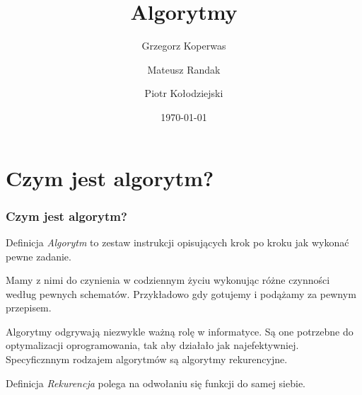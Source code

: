\documentclass{beamer}
\title{Algorytmy}
\author{Grzegorz Koperwas \and Mateusz Randak \and Piotr Kołodziejski}
\date{\today}
\begin{document}
\begin{frame}
    \titlepage
\end{frame}
\section{Czym jest algorytm?}
\begin{frame}
    \frametitle{Czym jest algorytm?}
    \begin{block}{Definicja}
        \emph{Algorytm} to zestaw instrukcji opisujących krok po kroku jak wykonać pewne zadanie.
    \end{block}
    Mamy z nimi do czynienia w codziennym życiu wykonując różne czynności według pewnych schematów. Przykładowo gdy gotujemy i podążamy za pewnym przepisem.

    Algorytmy odgrywają niezwykle ważną rolę w informatyce. Są one potrzebne do optymalizacji oprogramowania, tak aby działało jak najefektywniej. Specyficznnym rodzajem algorytmów są algorytmy rekurencyjne.

    \begin{block}{Definicja}
        \emph{Rekurencja} polega na odwołaniu się funkcji do samej siebie.
    \end{block}
\end{frame}
\end{document}
